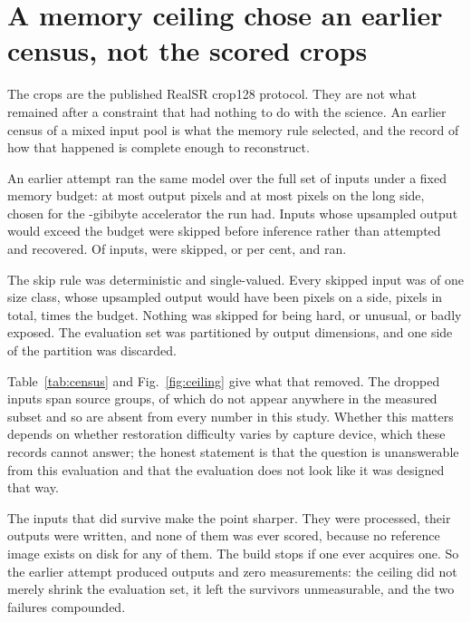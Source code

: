 \section{A memory ceiling chose an earlier census, not the scored crops}

The \SubsetN{} crops are the published RealSR crop128 protocol. They are not
what remained after a constraint that had nothing to do with the science. An
earlier census of a mixed input pool is what the memory rule selected, and the
record of how that happened is complete enough to reconstruct.

An earlier attempt ran the same model over the full set of \CensusTotal{} inputs
under a fixed memory budget: at most \BudgetPixels{} output pixels and at most
\BudgetLong{} pixels on the long side, chosen for the \BudgetVram{}-gibibyte
accelerator the run had. Inputs whose upsampled output would exceed the budget
were skipped before inference rather than attempted and recovered. Of
\CensusTotal{} inputs, \CensusSkipped{} were skipped, or \CensusSkipShare{} per
cent, and \CensusRan{} ran.

The skip rule was deterministic and single-valued. Every skipped input was of one
size class, whose upsampled output would have been \SkippedSide{} pixels on a
side, \SkippedPixels{} pixels in total, \BudgetExcess{} times the budget. Nothing
was skipped for being hard, or unusual, or badly exposed. The evaluation set was
partitioned by output dimensions, and one side of the partition was discarded.

Table~\ref{tab:census} and Fig.~\ref{fig:ceiling} give what that removed. The
dropped inputs span \CensusCameras{} source groups, of which \AbsentGroups{} do
not appear anywhere in the measured subset and so are absent from every number in
this study. Whether this matters depends on whether restoration difficulty varies
by capture device, which these records cannot answer; the honest statement is
that the question is unanswerable from this evaluation and that the evaluation
does not look like it was designed that way.

The \CensusRan{} inputs that did survive make the point sharper. They were
processed, their outputs were written, and none of them was ever scored, because
no reference image exists on disk for any of them. The build stops if one ever
acquires one. So the earlier attempt produced \OrphanStems{} outputs and zero
measurements: the ceiling did not merely shrink the evaluation set, it left the
survivors unmeasurable, and the two failures compounded.

